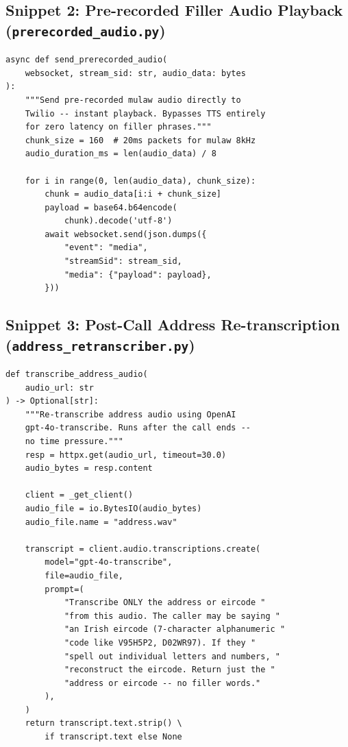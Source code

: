 \documentclass[conference]{IEEEtran}
\begin{document}
\subsection*{Snippet 2: Pre-recorded Filler Audio Playback (\texttt{prerecorded\_audio.py})}
\begin{lstlisting}[caption={Zero-latency filler audio playback bypassing TTS}]
async def send_prerecorded_audio(
    websocket, stream_sid: str, audio_data: bytes
):
    """Send pre-recorded mulaw audio directly to
    Twilio -- instant playback. Bypasses TTS entirely
    for zero latency on filler phrases."""
    chunk_size = 160  # 20ms packets for mulaw 8kHz
    audio_duration_ms = len(audio_data) / 8

    for i in range(0, len(audio_data), chunk_size):
        chunk = audio_data[i:i + chunk_size]
        payload = base64.b64encode(
            chunk).decode('utf-8')
        await websocket.send(json.dumps({
            "event": "media",
            "streamSid": stream_sid,
            "media": {"payload": payload},
        }))
\end{lstlisting}

\subsection*{Snippet 3: Post-Call Address Re-transcription (\texttt{address\_retranscriber.py})}
\begin{lstlisting}[caption={Offline re-transcription using OpenAI gpt-4o-transcribe}]
def transcribe_address_audio(
    audio_url: str
) -> Optional[str]:
    """Re-transcribe address audio using OpenAI
    gpt-4o-transcribe. Runs after the call ends --
    no time pressure."""
    resp = httpx.get(audio_url, timeout=30.0)
    audio_bytes = resp.content

    client = _get_client()
    audio_file = io.BytesIO(audio_bytes)
    audio_file.name = "address.wav"

    transcript = client.audio.transcriptions.create(
        model="gpt-4o-transcribe",
        file=audio_file,
        prompt=(
            "Transcribe ONLY the address or eircode "
            "from this audio. The caller may be saying "
            "an Irish eircode (7-character alphanumeric "
            "code like V95H5P2, D02WR97). If they "
            "spell out individual letters and numbers, "
            "reconstruct the eircode. Return just the "
            "address or eircode -- no filler words."
        ),
    )
    return transcript.text.strip() \
        if transcript.text else None
\end{lstlisting}
\end{document}
